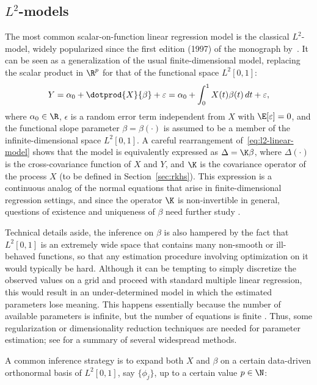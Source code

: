\subsection*{\(L^2\)-models}

 The most common scalar-on-function linear regression model is the classical \(L^2\)-model, widely popularized since the first edition (1997) of the monograph by~\citet{ramsay2005functional}. It can be seen as a generalization of the usual finite-dimensional model, replacing the scalar product in \(\R^p\) for that of the functional space \(L^2[0,1]\):
\begin{equation}\label{eq:l2-linear-model}
Y = \alpha_0 + \dotprod{X}{\beta} + \epsilon = \alpha_0 + \int_0^1 X(t)\beta(t)\, dt + \epsilon,
\end{equation}
where \(\alpha_0\in \R\), \(\epsilon\) is a random error term independent from \(X\) with \(\E [\epsilon]=0\), and the functional slope parameter \(\beta=\beta(\cdot)\) is assumed to be a member of the infinite-dimensional space \(L^2[0, 1]\). A careful rearrangement of~\eqref{eq:l2-linear-model} shows that the model is equivalently expressed as \(\Delta=\K\beta\), where \(\Delta(\cdot)\) is the cross-covariance function of \(X\) and \(Y\), and \(\K\) is the covariance operator of the process \(X\) (to be defined in Section~\ref{sec:rkhs}). This expression is a continuous analog of the normal equations that arise in finite-dimensional regression settings, and since the operator \(\K\) is non-invertible in general, questions of existence and uniqueness of \(\beta\) need further study \citep[see][]{cardot2011functional}.

Technical details aside, the inference on \(\beta\) is also hampered by the fact that \(L^2[0,1]\) is an extremely wide space that contains many non-smooth or ill-behaved functions, so that any estimation procedure involving optimization on it would typically be hard.
Although it can be tempting to simply discretize the observed values on a grid and proceed with standard multiple linear regression, this would result in an under-determined model in which the estimated parameters lose meaning. This happens essentially because the number of available parameters is infinite, but the number of equations is finite \citep[see][Sec.~15.2]{ramsay2005functional}. Thus, some regularization or dimensionality reduction techniques are needed for parameter estimation; see \citet{reiss2017methods} for a summary of several widespread methods.

A common inference strategy is to expand both \(X\) and \(\beta\) on a certain data-driven orthonormal basis of \(L^2[0,1]\), say \(\{\phi_j\}\), up to a certain value \(p\in\N\):

